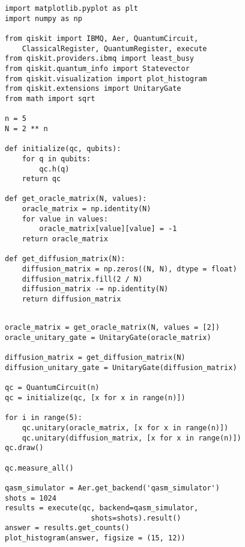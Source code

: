 \documentclass[a4paper]{article}
\begin{document}
\begin{tcolorbox}[
    enhanced,
    attach boxed title to top left={xshift=6mm,yshift=-3mm},
    title=Simulation Code,
    boxed title style={size=small,sharp corners},
    sharp corners,
]
\begin{verbatim}
import matplotlib.pyplot as plt
import numpy as np

from qiskit import IBMQ, Aer, QuantumCircuit,
    ClassicalRegister, QuantumRegister, execute
from qiskit.providers.ibmq import least_busy
from qiskit.quantum_info import Statevector
from qiskit.visualization import plot_histogram
from qiskit.extensions import UnitaryGate
from math import sqrt

n = 5
N = 2 ** n

def initialize(qc, qubits):
    for q in qubits:
        qc.h(q)
    return qc

def get_oracle_matrix(N, values):
    oracle_matrix = np.identity(N)
    for value in values:
        oracle_matrix[value][value] = -1
    return oracle_matrix

def get_diffusion_matrix(N):
    diffusion_matrix = np.zeros((N, N), dtype = float)
    diffusion_matrix.fill(2 / N)
    diffusion_matrix -= np.identity(N)
    return diffusion_matrix

\end{verbatim}
\end{tcolorbox}
\begin{tcolorbox}[
    enhanced,
    attach boxed title to top left={xshift=6mm,yshift=-3mm},
    title=Simulation Code,
    boxed title style={size=small,sharp corners},
    sharp corners,
]
\begin{verbatim}

oracle_matrix = get_oracle_matrix(N, values = [2])
oracle_unitary_gate = UnitaryGate(oracle_matrix)

diffusion_matrix = get_diffusion_matrix(N)
diffusion_unitary_gate = UnitaryGate(diffusion_matrix)

qc = QuantumCircuit(n)
qc = initialize(qc, [x for x in range(n)])

for i in range(5):
    qc.unitary(oracle_matrix, [x for x in range(n)])
    qc.unitary(diffusion_matrix, [x for x in range(n)])
qc.draw()

qc.measure_all()

qasm_simulator = Aer.get_backend('qasm_simulator')
shots = 1024
results = execute(qc, backend=qasm_simulator,
                    shots=shots).result()
answer = results.get_counts()
plot_histogram(answer, figsize = (15, 12))
\end{verbatim}
\end{tcolorbox}
\end{document}
